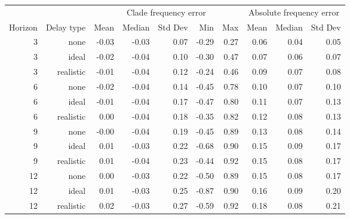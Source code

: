 
\begin{tabular*}{1.0\textwidth}{rrrrrrrrrr}
\toprule
        &            & \multicolumn{5}{c}{Clade frequency error} & \multicolumn{3}{c}{Absolute frequency error} \\
Horizon & Delay type & Mean & Median & Std Dev & Min & Max & Mean & Median & Std Dev \\
\midrule

3 & none & -0.03 & -0.03 & 0.07 & -0.29 & 0.27 & 0.06 & 0.04 & 0.05 \\
3 & ideal & -0.02 & -0.04 & 0.10 & -0.30 & 0.47 & 0.07 & 0.06 & 0.07 \\
3 & realistic & -0.01 & -0.04 & 0.12 & -0.24 & 0.46 & 0.09 & 0.07 & 0.08 \\
6 & none & -0.02 & -0.04 & 0.14 & -0.45 & 0.78 & 0.10 & 0.07 & 0.10 \\
6 & ideal & -0.01 & -0.04 & 0.17 & -0.47 & 0.80 & 0.11 & 0.07 & 0.13 \\
6 & realistic & 0.00 & -0.04 & 0.18 & -0.35 & 0.82 & 0.12 & 0.08 & 0.13 \\
9 & none & -0.00 & -0.04 & 0.19 & -0.45 & 0.89 & 0.13 & 0.08 & 0.14 \\
9 & ideal & 0.01 & -0.03 & 0.22 & -0.68 & 0.90 & 0.15 & 0.09 & 0.17 \\
9 & realistic & 0.01 & -0.04 & 0.23 & -0.44 & 0.92 & 0.15 & 0.08 & 0.17 \\
12 & none & 0.00 & -0.03 & 0.22 & -0.50 & 0.89 & 0.15 & 0.08 & 0.17 \\
12 & ideal & 0.01 & -0.03 & 0.25 & -0.87 & 0.90 & 0.16 & 0.09 & 0.20 \\
12 & realistic & 0.02 & -0.03 & 0.27 & -0.59 & 0.92 & 0.18 & 0.08 & 0.21 \\

\bottomrule
\end{tabular*}


